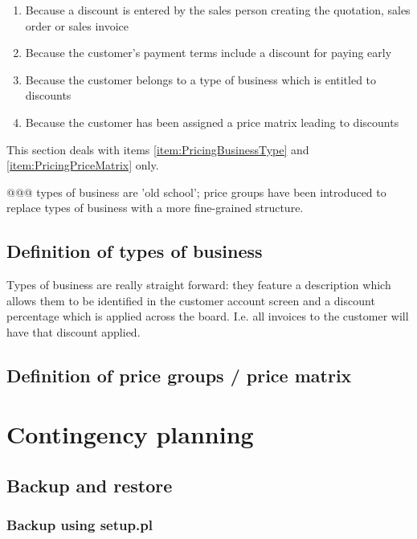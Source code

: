 \begin{enumerate}
\item Because a discount is entered by the sales person creating the quotation,
  sales order or sales invoice
\item Because the customer's payment terms include a discount for paying early
\item Because the customer belongs to a type of business which is entitled to discounts
\label{item:PricingBusinessType}
\item Because the customer has been assigned a price matrix leading to discounts
\label{item:PricingPriceMatrix}
\end{enumerate}

This section deals with items \ref{item:PricingBusinessType} and \ref{item:PricingPriceMatrix} only.

@@@ types of business are 'old school'; price groups have been introduced to replace types of business with a more fine-grained structure.

\section{Definition of types of business}
\label{sec-pricing-business-types}

Types of business are really straight forward: they feature a description
which allows them to be identified in the customer account screen and a discount
percentage which is applied across the board. I.e. all invoices to the customer
will have that discount applied.

\section{Definition of price groups / price matrix}
\label{sec-pricing-price-groups}

\chapter{Contingency planning}
\label{cha-contingency}

\section{Backup and restore}
\label{sec-contingency-backup-restore}

\subsection{Backup using setup.pl}
\label{subsec-contingency-backup-setup-pl}


